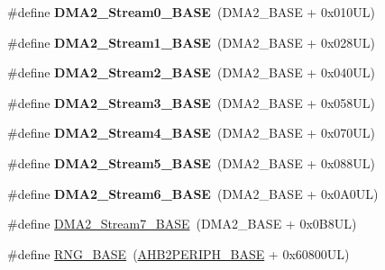 \begin{DoxyCompactItemize}
\#define {\bfseries D\+M\+A2\+\_\+\+Stream0\+\_\+\+B\+A\+SE}~(D\+M\+A2\+\_\+\+B\+A\+SE + 0x010\+U\+L)
\item 
\mbox{\label{group___peripheral__memory__map_ga35512bdc3f5e9df4557c2fbe7935d0b1}} 
\#define {\bfseries D\+M\+A2\+\_\+\+Stream1\+\_\+\+B\+A\+SE}~(D\+M\+A2\+\_\+\+B\+A\+SE + 0x028\+U\+L)
\item 
\mbox{\label{group___peripheral__memory__map_gaed33a06f08188466f2ede06160984e9a}} 
\#define {\bfseries D\+M\+A2\+\_\+\+Stream2\+\_\+\+B\+A\+SE}~(D\+M\+A2\+\_\+\+B\+A\+SE + 0x040\+U\+L)
\item 
\mbox{\label{group___peripheral__memory__map_gaf3a9480e08c6ae94f4482e0cdaebdd17}} 
\#define {\bfseries D\+M\+A2\+\_\+\+Stream3\+\_\+\+B\+A\+SE}~(D\+M\+A2\+\_\+\+B\+A\+SE + 0x058\+U\+L)
\item 
\mbox{\label{group___peripheral__memory__map_gad1e67740e6301233473f64638145dd1f}} 
\#define {\bfseries D\+M\+A2\+\_\+\+Stream4\+\_\+\+B\+A\+SE}~(D\+M\+A2\+\_\+\+B\+A\+SE + 0x070\+U\+L)
\item 
\mbox{\label{group___peripheral__memory__map_gaed1460fdc407b6decfbffccb0260d0af}} 
\#define {\bfseries D\+M\+A2\+\_\+\+Stream5\+\_\+\+B\+A\+SE}~(D\+M\+A2\+\_\+\+B\+A\+SE + 0x088\+U\+L)
\item 
\mbox{\label{group___peripheral__memory__map_ga5e81174c96fd204fa7c82c815e85c8e6}} 
\#define {\bfseries D\+M\+A2\+\_\+\+Stream6\+\_\+\+B\+A\+SE}~(D\+M\+A2\+\_\+\+B\+A\+SE + 0x0\+A0\+U\+L)
\item 
\#define \mbox{\hyperlink{group___peripheral__memory__map_gaa9faa708ad2440d24eb1064cba9bb06d}{D\+M\+A2\+\_\+\+Stream7\+\_\+\+B\+A\+SE}}~(D\+M\+A2\+\_\+\+B\+A\+SE + 0x0\+B8\+U\+L)
\item 
\#define \mbox{\hyperlink{group___peripheral__memory__map_gab92662976cfe62457141e5b4f83d541c}{R\+N\+G\+\_\+\+B\+A\+SE}}~(\mbox{\hyperlink{group___peripheral__memory__map_gaeedaa71d22a1948492365e2cd26cfd46}{A\+H\+B2\+P\+E\+R\+I\+P\+H\+\_\+\+B\+A\+SE}} + 0x60800\+U\+L)
\item 
\mbox{\label{group___peripheral__memory__map_ga1d581e6f64ed2e5d97c11c58285a21b6}} 

\end{DoxyCompactItemize}
